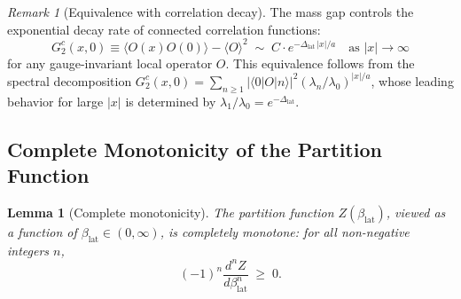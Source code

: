 \documentclass[12pt,a4paper]{article}
\theoremstyle{plain}
\newtheorem{lemma}[theorem]{Lemma}
\theoremstyle{definition}
\theoremstyle{remark}
\newtheorem{remark}[theorem]{Remark}
\begin{document}
\begin{remark}[Equivalence with correlation decay]
The mass gap controls the exponential decay rate of connected correlation functions:
\begin{equation}\label{eq:expdecay}
G_2^c(x,0) \equiv \langle O(x)O(0)\rangle - \langle O\rangle^2 \;\sim\; C\cdot e^{-\Delta_{\mathrm{lat}}\,|x|/a} \quad\text{as }|x|\to\infty
\end{equation}
for any gauge-invariant local operator $O$. This equivalence follows from the spectral decomposition $G_2^c(x,0)=\sum_{n\geq 1}|\langle 0|O|n\rangle|^2(\lambda_n/\lambda_0)^{|x|/a}$, whose leading behavior for large $|x|$ is determined by $\lambda_1/\lambda_0=e^{-\Delta_{\mathrm{lat}}}$.
\end{remark}

\subsection{Complete Monotonicity of the Partition Function}\label{sec:cm}

\begin{lemma}[Complete monotonicity]\label{lem:cm}
The partition function $Z(\beta_{\mathrm{lat}})$, viewed as a function of $\beta_{\mathrm{lat}}\in(0,\infty)$, is completely monotone: for all non-negative integers $n$,
\begin{equation}\label{eq:cm}
(-1)^n\frac{d^n Z}{d\beta_{\mathrm{lat}}^n} \;\geq\; 0.
\end{equation}
\end{lemma}
\end{document}
